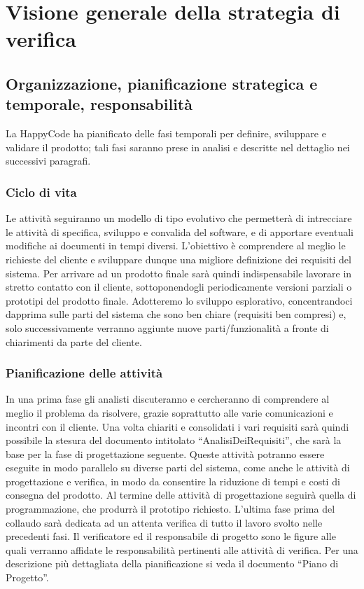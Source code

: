 \documentclass[11pt,titlepage,a4paper]{report}
\begin{document}
\chapter[Strategia di verifica]{Visione generale della strategia di verifica}
\section[Organizzazione, pianificazione, responsabilit\`a]{Organizzazione, pianificazione strategica e temporale, responsabilit\`a}
La HappyCode ha  pianificato delle fasi temporali per definire, sviluppare e validare il prodotto; tali fasi saranno prese in analisi e descritte nel dettaglio nei successivi paragrafi.

\subsection{Ciclo di vita}
Le attivit\`a seguiranno un modello di tipo evolutivo che permetter\`a di intrecciare le attivit\`a di specifica, sviluppo e convalida del software, e di apportare eventuali modifiche ai documenti in tempi diversi. L'obiettivo \`e comprendere al meglio le richieste del cliente e sviluppare dunque una migliore definizione dei requisiti del sistema. Per arrivare ad un prodotto finale sar\`a quindi indispensabile lavorare in stretto contatto con il cliente, sottoponendogli periodicamente versioni parziali o prototipi del prodotto finale. Adotteremo lo sviluppo esplorativo, concentrandoci dapprima sulle parti del sistema che sono ben chiare (requisiti ben compresi) e, solo successivamente verranno aggiunte nuove parti/funzionalit\`a a fronte di chiarimenti da parte del cliente. 
\subsection{Pianificazione delle attivit\`a}
In una prima fase gli analisti discuteranno e cercheranno di comprendere al meglio il problema da risolvere, grazie soprattutto alle varie comunicazioni e incontri con il cliente. Una volta chiariti e consolidati i vari requisiti sar\`a quindi possibile la stesura del documento intitolato ``AnalisiDeiRequisiti'', che sar\`a la base per la fase di progettazione seguente. Queste attivit\`a potranno essere eseguite in modo parallelo su diverse parti del sistema, come anche le attivit\`a di progettazione e verifica, in modo da consentire la riduzione di tempi e costi di consegna del prodotto. Al termine delle attivit\`a di progettazione seguir\`a quella di programmazione, che produrr\`a il prototipo richiesto. L'ultima fase prima del collaudo sar\`a dedicata ad un attenta verifica di tutto il lavoro svolto nelle precedenti fasi. Il verificatore ed il responsabile di progetto sono le figure alle quali verranno affidate le responsabilit\`a pertinenti alle attivit\`a di verifica. Per una descrizione pi\`u dettagliata della pianificazione si veda il documento ``Piano di Progetto''.
\end{document}

